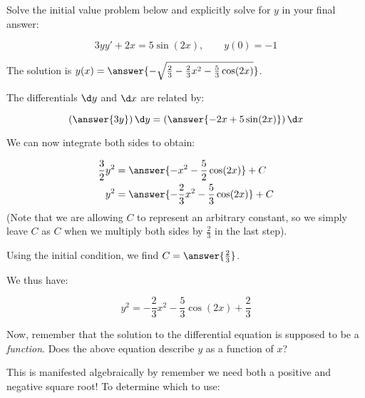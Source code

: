 \documentclass{ximera}
\author{Jim Talamo}
\begin{document}
\begin{exercise}
Solve the initial value problem below and explicitly solve for $y$ in your final answer:

\[
3y y' +2x = 5\sin(2x)  , \qquad y(0)=-1
\]

The solution is $y(x) = \answer{ - \sqrt{\frac{2}{3} -\frac{2}{3}x^2 -\frac{5}{3} \cos(2x)} }$.

\begin{hint}
The differentials $\d y$ and $\d x$ are related by:

\[
\left(\answer{3y} \right) \d y = \left(\answer{ -2x+5\sin(2x) } \right) \d x
\]

\begin{question}
We can now integrate both sides to obtain:

\begin{align*}
\frac{3}{2}y^2 &= \answer{-x^2-\frac{5}{2}\cos(2x)} +C\\
y^2 &= \answer{-\frac{2}{3}x^2 -\frac{5}{3}\cos(2x)}+C
\end{align*}
(Note that we are allowing $C$ to represent an arbitrary constant, so we simply leave $C$ as $C$ when we multiply both sides by $\frac{2}{3}$ in the last step).

Using the initial condition, we find $C=\answer{\frac{2}{3}}$.

\begin{question}

\end{question}
We thus have:

\[
y^2 = -\frac{2}{3}x^2 -\frac{5}{3}\cos(2x)+\frac{2}{3}
\]

Now, remember that the solution to the differential equation is supposed to be a \emph{function}.  Does the above equation describe $y$ as a function of $x$?

\begin{multipleChoice}
\end{multipleChoice}

This is manifested algebraically by remember we need both a positive and negative square root!  To determine which to use:

\begin{multipleChoice}
\end{multipleChoice}
\end{question}
 \end{hint}
 
\end{exercise}
\end{document}
